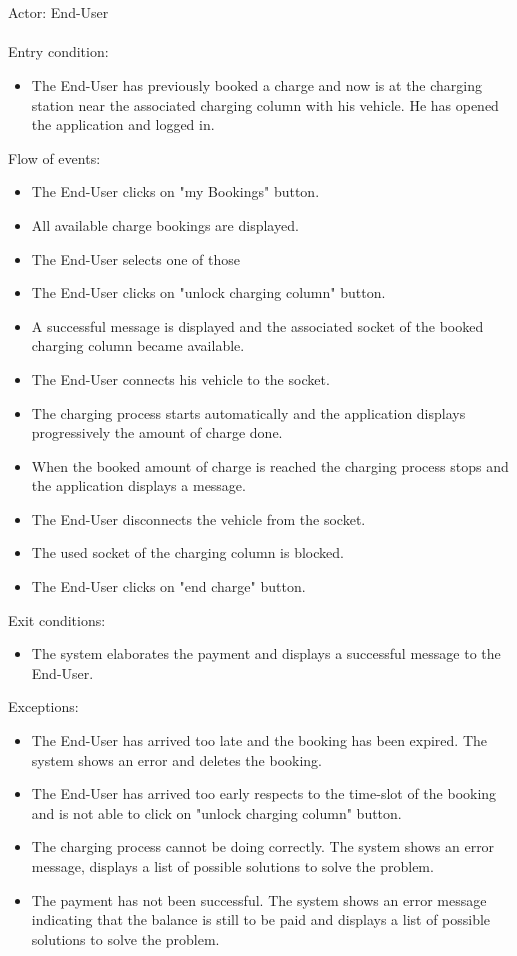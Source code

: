 \documentclass[a4paper]{report}
\begin{document}
\\ \\
Actor: End-User \\ \\
Entry condition:
\begin{itemize}
\item The End-User has previously booked a charge and now is at the charging station near the associated charging column with his vehicle. He has opened the application and logged in.
\end{itemize}
Flow of events:
\begin{itemize}
\item The End-User clicks on "my Bookings" button.
\item All available charge bookings are displayed.
\item The End-User selects one of those
\item The End-User clicks on "unlock charging column" button.
\item A successful message is displayed and the associated socket of the booked charging column became available.
\item The End-User connects his vehicle to the socket.
\item The charging process starts automatically and the application displays progressively the amount of charge done.
\item When the booked amount of charge is reached the charging process stops and the application displays a message.
\item The End-User disconnects the vehicle from the socket.
\item The used socket of the charging column is blocked.
\item The End-User clicks on "end charge" button.
\end{itemize}
Exit conditions:
\begin{itemize}
\item The system elaborates the payment and displays a successful message to the End-User.
\end{itemize}
Exceptions:
\begin{itemize}
\item The End-User has arrived too late and the booking has been expired. The system shows an error and deletes the booking.
\item The End-User has arrived too early respects to the time-slot of the booking and is not able to click on "unlock charging column" button.
\item The charging process cannot be doing correctly. The system shows an error message, displays a list of possible solutions to solve the problem.
\item The payment has not been successful. The system shows an error message indicating that the balance is still to be paid and displays a list of possible solutions to solve the problem.
\end{itemize}
\end{document}
